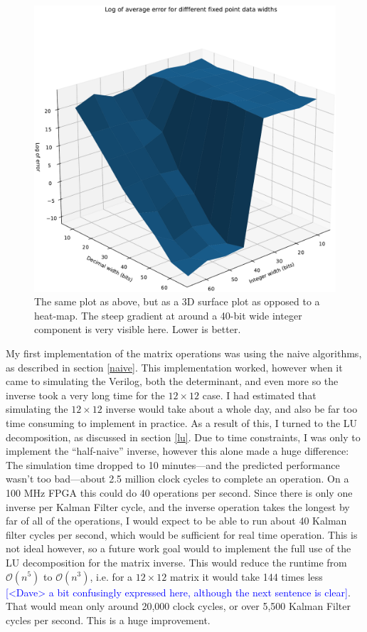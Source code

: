 \documentclass[12pt]{article}
\newcommand{\note}[2][red]{\textcolor{#1}{#2}}
\newcommand{\notedme}[1]{\note[blue]{[<Dave> #1]}}
\begin{document}
\begin{figure}[thp]
	\centering
	
	\includegraphics[width=\textwidth]{sfc_plot_full.pdf}
	
	\caption{The same plot as above, but as a 3D surface plot as opposed to a heat-map. The steep gradient at around a 40-bit wide integer component is very visible here. Lower is better.}
	\label{full_sfc}
\end{figure}

My first implementation of the matrix operations was using the naive algorithms, as described in section \ref{naive}. This implementation worked, however when it came to simulating the Verilog, both the determinant, and even more so the inverse took a very long time for the $12 \times 12$ case. I had estimated that simulating the $12 \times 12$ inverse would take about a whole day, and also be far too time consuming to implement in practice. As a result of this, I turned to the LU decomposition, as discussed in section \ref{lu}. Due to time constraints, I was only to implement the ``half-naive'' inverse, however this alone made a huge difference: The simulation time dropped to 10 minutes---and the predicted performance wasn't too bad---about 2.5 million clock cycles to complete an operation. On a 100 MHz FPGA this could do 40 operations per second. Since there is only one inverse per Kalman Filter cycle, and the inverse operation takes the longest by far of all of the operations, I would expect to be able to run about 40 Kalman filter cycles per second, which would be sufficient for real time operation. This is not ideal however, so a future work goal would to implement the full use of the LU decomposition for the matrix inverse. This would reduce the runtime from $\mathcal{O}(n^5)$ to $\mathcal{O}(n^3)$, i.e. for a $12 \times 12$ matrix it would take 144 times less \notedme{a bit confusingly expressed here, although the next sentence is clear}. That would mean only around 20,000 clock cycles, or over 5,500 Kalman Filter cycles per second. This is a huge improvement.
\end{document}
